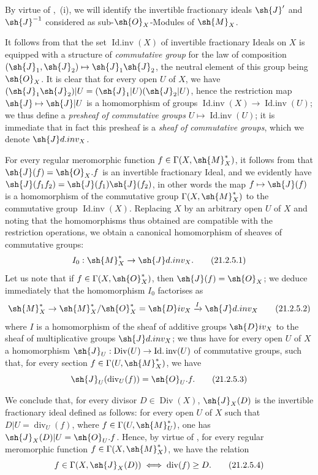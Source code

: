 By virtue of ,~(i), we will identify the invertible fractionary ideals $\sh{J}'$ and $\sh{J}^{-1}$ considered as sub-$\sh{O}_X$-Modules of $\sh{M}_X$.

\begin{env}[21.2.4]
\label{IV.21.2.4}
It follows from  that the set $\operatorname{Id.inv}(X)$ of invertible fractionary Ideals on $X$ is equipped with a structure of \emph{commutative group} for the law of composition $(\sh{J}_1,\sh{J}_2)\mapsto\sh{J}_1\sh{J}_2$, the neutral element of this group being $\sh{O}_X$.
It is clear that for every open $U$ of $X$, we have $(\sh{J}_1\sh{J}_2)|U=(\sh{J}_1|U)(\sh{J}_2|U)$, hence the restriction map $\sh{J}\mapsto\sh{J}|U$ is a homomorphism of groups $\operatorname{Id.inv}(X)\to\operatorname{Id.inv}(U)$;
we thus define a \emph{presheaf of commutative groups} $U\mapsto\operatorname{Id.inv}(U)$;
it is immediate that in fact this presheaf is a \emph{sheaf of commutative groups}, which we denote $\sh{J}d.inv_X$.
\end{env}

\begin{env}[21.2.5]
\label{IV.21.2.5}
For every regular meromorphic function $f\in\Gamma(X,\sh{M}_X^*)$, it follows from  that $\sh{J}(f)=\sh{O}_X.f$ is an invertible fractionary Ideal, and we evidently have $\sh{J}(f_1f_2)=\sh{J}(f_1)\sh{J}(f_2)$, in other words the map $f\mapsto\sh{J}(f)$ is a homomorphism of the commutative group $\Gamma(X,\sh{M}_X^*)$ to the commutative group $\operatorname{Id.inv}(X)$.
Replacing $X$ by an arbitrary open $U$ of $X$ and noting that the homomorphisms thus obtained are compatible with the restriction operations, we obtain a canonical homomorphism of sheaves of commutative groups:
\[
\label{IV.21.2.5.1}
  I_0:\sh{M}_X^*\to\sh{J}d.inv_X.
  \tag{21.2.5.1}
\]
Let us note that if $f\in\Gamma(X,\sh{O}_X^*)$, then $\sh{J}(f)=\sh{O}_X$;
we deduce immediately that the homomorphism $I_0$ factorises as
\[
\label{IV.21.2.5.2}
  \sh{M}_X^*\to\sh{M}_X^*/\sh{O}_X^*=\sh{D}iv_X\xrightarrow{I}\sh{J}d.inv_X
  \tag{21.2.5.2}
\]
where $I$ is a homomorphism of the sheaf of additive groups $\sh{D}iv_X$ to the sheaf of multiplicative groups $\sh{J}d.inv_X$;
we thus have for every open $U$ of $X$ a homomorphism $\sh{J}_U:\operatorname{Div}(U)\to\operatorname{Id.inv}(U)$ of commutative groups, such that, for every section $f\in\Gamma(U,\sh{M}_X^*)$, we have
\[
\label{IV.21.2.5.3}
  \sh{J}_U(\operatorname{div}_U(f))=\sh{O}_U.f.
  \tag{21.2.5.3}
\]

We conclude that, for every divisor $D\in\operatorname{Div}(X)$, $\sh{J}_X(D)$ is the invertible fractionary ideal defined as follows:
for every open $U$ of $X$ such that $D|U=\operatorname{div}_U(f)$, where $f\in\Gamma(U,\sh{M}_U^*)$, one has $\sh{J}_X(D)|U=\sh{O}_U.f$.
Hence, by virtue of , for every regular meromorphic function $f\in\Gamma(X,\sh{M}_X^*)$, we have the relation
\[
\label{IV.21.2.5.4}
  f\in\Gamma(X,\sh{J}_X(D)) \iff \operatorname{div}(f)\geq D.
  \tag{21.2.5.4}
\]
\end{env}

